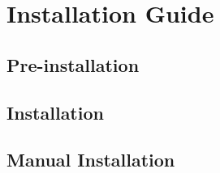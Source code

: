 \section{Installation Guide}
\lipsum[4]

\subsection{Pre-installation}
\lipsum[2]

\subsection{Installation}
\lipsum[2]

\subsection{Manual Installation}
\lipsum[1]

